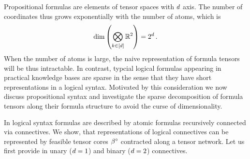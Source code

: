 Propositional formulas are elements of tensor spaces with $d$ axis. 
The number of coordinates thus grows exponentially with the number of atoms, which is
\begin{align*}
	\mathrm{dim}\left(\bigotimes_{k\in[d]}\mathbb{R}^2\right) = 2^{d} \, .
\end{align*}
When the number of atoms is large, the naive representation of formula tensors will be thus intractable.
In contrast, typcial logical formulas appearing in practical knowledge bases are sparse in the sense that they have short representations in a logical syntax.
Motivated by this consideration we now discuss propositional syntax and investigate the sparse decomposition of formula tensors along their formula structure to avoid the curse of dimensionality.

In logical syntax formulas are described by atomic formulas recursively connected via connectives. 
We show, that representations of logical connectives can be represented by feasible tensor cores $\beta^{\circ}$ contracted along a tensor network.
Let us first provide in  unary ($d=1$) and binary ($d=2$) connectives.


